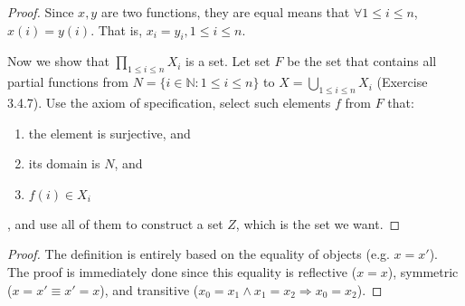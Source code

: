 \begin{proof}
Since $x,y$ are two functions, they are equal means that $\forall 1\leq i \leq n$, $x(i) = y(i)$. That 
is, $x_i = y_i, 1\leq i \leq n$.

Now we show that $\displaystyle \prod_{1\leq i\leq n}X_i$ is a set. Let set $F$ be the set that contains 
all partial functions from $N = \{i \in \mathbb{N}:1\leq i\leq n\}$ to 
$\displaystyle X = \bigcup_{1\leq i\leq n}X_i$ (Exercise 3.4.7). Use the axiom of specification, select 
such elements $f$ from $F$ that:
\begin{enumerate}
\item the element is surjective, and
\item its domain is $N$, and 
\item $f(i) \in X_i$
\end{enumerate}, 
and use all of them to construct a set $Z$, which is the set we want.
\end{proof}

\begin{proof}
The definition is entirely based on the equality of objects (e.g. $x = x'$). The proof is immediately 
done since this equality is reflective ($x = x$), symmetric ($x = x' \equiv x' = x$), and transitive 
($x_0 = x_1 \wedge x_1 = x_2 \Longrightarrow x_0 = x_2$).
\end{proof}

